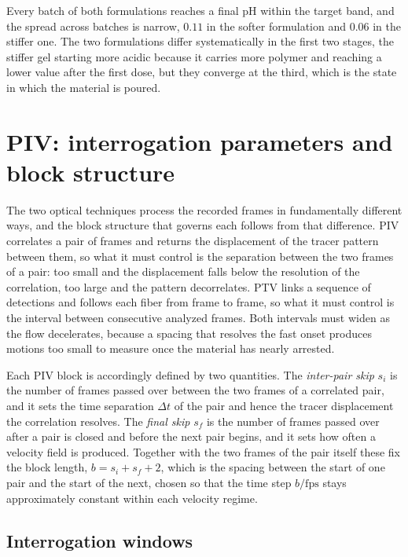 \documentclass[%
  aip,
  pof,
  reprint,
  floatfix
]{revtex4-2}
\begin{document}
Every batch of both formulations reaches a final pH within the target band, and the spread across batches is narrow, $0.11$ in the softer formulation and $0.06$ in the stiffer one. The two formulations differ systematically in the first two stages, the stiffer gel starting more acidic because it carries more polymer and reaching a lower value after the first dose, but they converge at the third, which is the state in which the material is poured.


\section{PIV: interrogation parameters and block structure}
\label{sup:piv}

The two optical techniques process the recorded frames in fundamentally different ways, and the block structure that governs each follows from that difference. PIV correlates a pair of frames and returns the displacement of the tracer pattern between them, so what it must control is the separation between the two frames of a pair: too small and the displacement falls below the resolution of the correlation, too large and the pattern decorrelates. PTV links a sequence of detections and follows each fiber from frame to frame, so what it must control is the interval between consecutive analyzed frames. Both intervals must widen as the flow decelerates, because a spacing that resolves the fast onset produces motions too small to measure once the material has nearly arrested.

Each PIV block is accordingly defined by two quantities. The \emph{inter-pair skip} $s_i$ is the number of frames passed over between the two frames of a correlated pair, and it sets the time separation $\Delta t$ of the pair and hence the tracer displacement the correlation resolves. The \emph{final skip} $s_f$ is the number of frames passed over after a pair is closed and before the next pair begins, and it sets how often a velocity field is produced. Together with the two frames of the pair itself these fix the block length, $b = s_i + s_f + 2$, which is the spacing between the start of one pair and the start of the next, chosen so that the time step $b/\mathrm{fps}$ stays approximately constant within each velocity regime.

\subsection{Interrogation windows}
\end{document}
